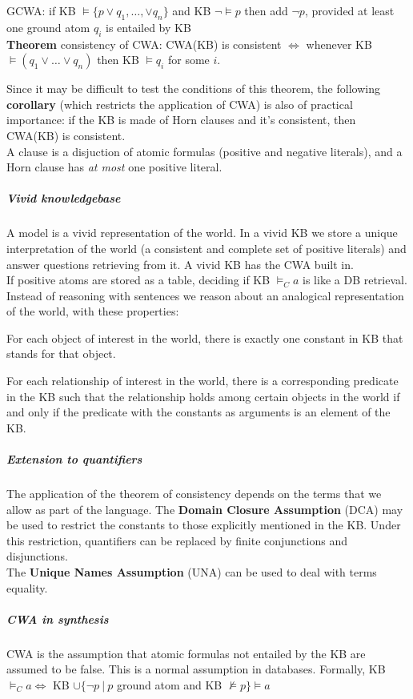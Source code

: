 \documentclass[10pt]{report}
\begin{document}
\begin{list}{}{}
	\item GCWA: if KB $\vDash\{p\vee q_1,\ldots,\vee q_n\}$ and KB $\neg\vDash p$ then add $\neg p$, provided at least one ground atom $q_i$ is entailed by KB\\
	\textbf{Theorem} consistency of CWA: CWA(KB) is consistent $\Leftrightarrow$ whenever KB $\vDash(q_1\vee\ldots\vee q_n)$ then KB $\vDash q_i$ for some $i$.
\end{list}
Since it may be difficult to test the conditions of this theorem, the following \textbf{corollary} (which restricts the application of CWA) is also of practical importance: if the KB is made of Horn clauses and it's consistent, then CWA(KB) is consistent.\\
A clause is a disjuction of atomic formulas (positive and negative literals), and a Horn clause has \textit{at most} one positive literal.
\subparagraph{Vivid knowledgebase} A model is a vivid representation of the world. In a vivid KB we store a unique interpretation of the world (a consistent and complete set of positive literals) and answer questions retrieving from it. A vivid KB has the CWA built in.\\
If positive atoms are stored as a table, deciding if KB $\vDash_C a$ is like a DB retrieval. Instead of reasoning with sentences we reason about an analogical representation of the world, with these properties:
\begin{list}{}{}
	\item For each object of interest in the world, there is exactly one constant in KB that stands for that object.
	\item For each relationship of interest in the world, there is a corresponding predicate in the KB such that the relationship holds among certain objects in the world if and only if the predicate with the constants as arguments is an element of the KB.
\end{list}
\subparagraph{Extension to quantifiers} The application of the theorem of consistency depends on the terms that we allow as part of the language. The \textbf{Domain Closure Assumption} (DCA) may be used to restrict the constants to those explicitly mentioned in the KB. Under this restriction, quantifiers can be replaced by finite conjunctions and disjunctions.\\
The \textbf{Unique Names Assumption} (UNA) can be used to deal with terms equality.
\subparagraph{CWA in synthesis} CWA is the assumption that atomic formulas not entailed by the KB are assumed to be false. This is a normal assumption in databases. Formally, KB $\vDash_C a \Leftrightarrow$ KB $\cup\{\neg p\:|\:p$ ground atom and KB $\not\vDash p\}\vDash a$\\
\end{document}
